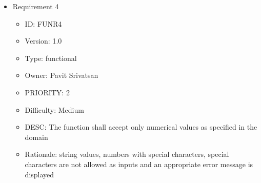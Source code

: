 \documentclass{article}
\begin{document}
\begin{itemize}
\begin{itemize}
\end{itemize}
\item Requirement 4
\begin{itemize}
\item ID:       FUNR4
\item Version:  1.0
\item Type:     functional
\item Owner:    Pavit Srivatsan
\item PRIORITY: 2
\item Difficulty: Medium
\item DESC: The function shall accept only numerical values as specified in the domain
\item Rationale: string values, numbers with special characters, special characters are not allowed as inputs and an appropriate error message is displayed
\end{itemize}
\end{itemize}
\end{document}
